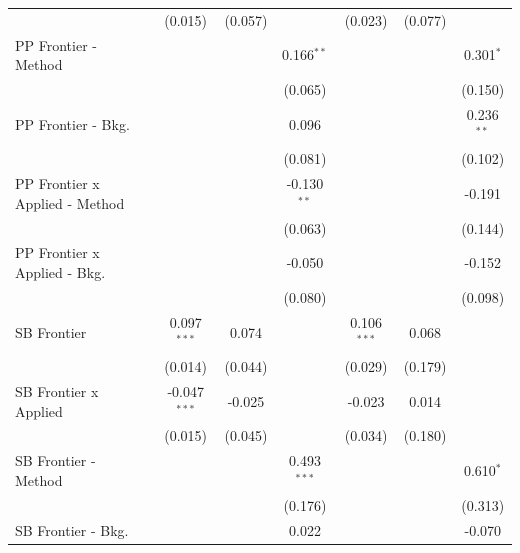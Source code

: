 \begin{tabular}{lcccccc}
                                  & (0.015)        & (0.057)        &                & (0.023)        & (0.077)        &   \\   
   PP Frontier - Method           &                &                & 0.166$^{**}$   &                &                & 0.301$^{*}$\\   
                                  &                &                & (0.065)        &                &                & (0.150)\\   
   PP Frontier - Bkg.             &                &                & 0.096          &                &                & 0.236$^{**}$\\   
                                  &                &                & (0.081)        &                &                & (0.102)\\   
   PP Frontier x Applied - Method &                &                & -0.130$^{**}$  &                &                & -0.191\\   
                                  &                &                & (0.063)        &                &                & (0.144)\\   
   PP Frontier x Applied - Bkg.   &                &                & -0.050         &                &                & -0.152\\   
                                  &                &                & (0.080)        &                &                & (0.098)\\   
   SB Frontier                    & 0.097$^{***}$  & 0.074          &                & 0.106$^{***}$  & 0.068          &   \\   
                                  & (0.014)        & (0.044)        &                & (0.029)        & (0.179)        &   \\   
   SB Frontier x Applied          & -0.047$^{***}$ & -0.025         &                & -0.023         & 0.014          &   \\   
                                  & (0.015)        & (0.045)        &                & (0.034)        & (0.180)        &   \\   
   SB Frontier - Method           &                &                & 0.493$^{***}$  &                &                & 0.610$^{*}$\\   
                                  &                &                & (0.176)        &                &                & (0.313)\\   
   SB Frontier - Bkg.             &                &                & 0.022          &                &                & -0.070\\   

\end{tabular}
